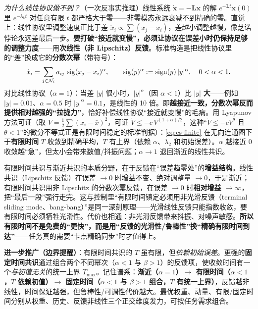 \emph{为什么线性协议做不到？}（一次反事实推理）线性系统 $\dot{\mathbf{x}}=-\mathbf{L}\mathbf{x}$ 的解 $e^{-\mathbf{L}t}\mathbf{x}(0)$ 里 $e^{-\lambda_k t}$ 对任意有限 $t$ 都严格大于零——非零模态永远衰减不到精确的零。直觉上：线性协议里调整速度正比于差 $\dot x_i\propto\sum(x_j-x_i)$，差越小调整越慢，像芝诺悖论永远差最后一步。\textbf{要打破“接近就变慢”，必须让协议在误差小时仍保持足够的调整力度}——用\textbf{次线性（非 Lipschitz）反馈}。标准构造是把线性协议里的“差”换成它的\textbf{分数次幂}（带符号）：
\begin{equation}
  \dot x_i=\sum_{j\in\mathcal{N}_i}a_{ij}\,\operatorname{sig}(x_j-x_i)^{\alpha},\qquad \operatorname{sig}(y)^\alpha:=\operatorname{sign}(y)\,|y|^{\alpha},\quad 0<\alpha<1.
  \label{eq:cs-finite}
\end{equation}
对比线性协议（$\alpha=1$）：当差 $|y|$ 很小时，$|y|^\alpha$（因 $\alpha<1$）比 $|y|$ \textbf{大}——例如 $|y|=0.01$、$\alpha=0.5$ 时 $|y|^\alpha=0.1$，是线性的 10 倍。即\textbf{越接近一致，分数次幂反而提供相对越强的“拉拢力”}，恰好补偿线性协议“接近就变慢”的毛病。用 Lyapunov 方法可证（取 $V=\tfrac12\sum(x_i-\bar x)^2$，可证 $\dot V\le-c\,V^{(1+\alpha)/2}$，这种“$\dot V\le-cV^\theta$ 且 $\theta<1$”的微分不等式正是有限时间稳定的标准判据）：\cref{eq:cs-finite} 在无向连通图下于\textbf{有限时间} $T$ 收敛到精确平均，$T$ 有上界（依赖 $\alpha$、$\lambda_2$ 和初始误差）。$\alpha$ 越接近 0 收敛越“急”，但太小会带来数值/抖振问题；$\alpha\to1$ 退回渐近的线性共识。

\begin{insight}\label{ins:cs-finite}
有限时间共识与渐近共识的本质分野，在于反馈在“误差趋零处”的\textbf{增益结构}。线性共识（Lipschitz 反馈）在误差 $\to0$ 时增益不变、绝对调整量 $\to0$，于是渐近；有限时间共识用非 Lipschitz 的分数次幂反馈，在误差 $\to0$ 时\textbf{相对增益 $\to\infty$}，把“最后一段”强行走完。这与控制里“有限时间镇定必须用非光滑反馈（terminal sliding mode、bang-bang）”是同一深刻原理——光滑线性反馈只能指数收敛，要有限时间必须牺牲光滑性。代价也相通：非光滑反馈带来抖振、对噪声敏感。\textbf{所以有限时间不是免费的“更快”，而是用“反馈的光滑性/鲁棒性”换“精确有限时间到达”}——任务真的需要“卡点精确同步”时才值得上。
\end{insight}

\textbf{进一步推广（边界提醒）}：有限时间共识的 $T$ 虽有限，但\emph{依赖初始误差}。更强的\textbf{固定时间共识}通过组合两个不同幂次（$\alpha<1$ 与 $\beta>1$）的反馈项，使收敛时间有一个\emph{与初值无关}的统一上界 $T_{\max}$。记住谱系：\textbf{渐近（$\alpha=1$）$\to$ 有限时间（$\alpha<1$，$T$ 依赖初值）$\to$ 固定时间（$\alpha<1$ 与 $\beta>1$ 组合，$T$ 有统一上界）}，反馈越非线性，时间保证越强，但鲁棒性/可调性代价越大。最优权重、动量、有限/固定时间分别从权重、历史、反馈非线性三个正交维度发力，可按任务需求组合。

